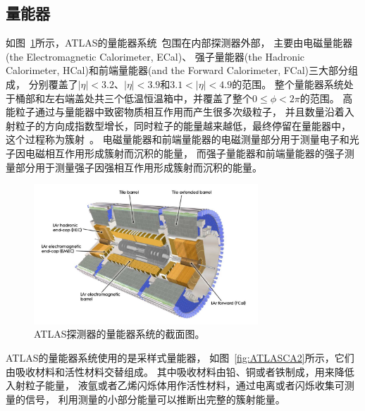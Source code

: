 \subsection{量能器}
\label{sec:ATLASCA}

如图~\ref{fig:ATLASCA1}所示，ATLAS的量能器系统~\cite{ATLASLACA,ATLASTCA}包围在内部探测器外部，
主要由电磁量能器(the Electromagnetic Calorimeter, ECal)、
强子量能器(the Hadronic Calorimeter, HCal)和前端量能器(and the Forward Calorimeter, FCal)三大部分组成，
分别覆盖了$|\eta|<3.2$、$|\eta|<3.9$和$3.1<|\eta|<4.9$的范围。
整个量能器系统处于桶部和左右端盖处共三个低温恒温箱中，并覆盖了整个$0\le\phi<2\pi$的范围。
高能粒子通过与量能器中致密物质相互作用而产生很多次级粒子，
并且数量沿着入射粒子的方向成指数型增长，同时粒子的能量越来越低，最终停留在量能器中，
这个过程称为簇射~\cite{CABOOK}。
电磁量能器和前端量能器的电磁测量部分用于测量电子和光子因电磁相互作用形成簇射而沉积的能量，
而强子量能器和前端量能器的强子测量部分用于测量强子因强相互作用形成簇射而沉积的能量。

\begin{figure}
  \begin{center}
    \includegraphics[width=0.75\textwidth]{figuresEXP/ATLASCA1.jpg}
  \end{center}
  \caption{
\textsc{ATLAS}探测器的量能器系统的截面图。
  }
    \label{fig:ATLASCA1}
\end{figure}

ATLAS的量能器系统使用的是采样式量能器，
如图~\ref{fig:ATLASCA2}所示，它们由吸收材料和活性材料交替组成。
其中吸收材料由铅、铜或者铁制成，用来降低入射粒子能量，
液氩或者乙烯闪烁体用作活性材料，通过电离或者闪烁收集可测量的信号，
利用测量的小部分能量可以推断出完整的簇射能量。

